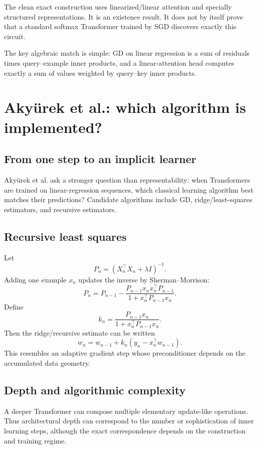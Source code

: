 \documentclass[11pt,a4paper,oneside,openany]{memoir}
\theoremstyle{definition}
\begin{document}
\begin{warningbox}
The clean exact construction uses linearized/linear attention and specially structured representations.  It is an existence result.  It does not by itself prove that a standard softmax Transformer trained by SGD discovers exactly this circuit.
\end{warningbox}

\begin{presentbox}
The key algebraic match is simple: GD on linear regression is a sum of residuals times query--example inner products, and a linear-attention head computes exactly a sum of values weighted by query--key inner products.
\end{presentbox}

\chapter{Aky\"urek et al.: which algorithm is implemented?}
\section{From one step to an implicit learner}
Aky\"urek et al. ask a stronger question than representability: when Transformers are trained on linear-regression sequences, which classical learning algorithm best matches their predictions?  Candidate algorithms include GD, ridge/least-squares estimators, and recursive estimators.

\section{Recursive least squares}
Let
\[
P_n=(X_n^\top X_n+\lambda I)^{-1}.
\]
Adding one example $x_n$ updates the inverse by Sherman--Morrison:
\[
P_n
=P_{n-1}
-\frac{P_{n-1}x_nx_n^\top P_{n-1}}
{1+x_n^\top P_{n-1}x_n}.
\]
Define
\[
k_n=\frac{P_{n-1}x_n}{1+x_n^\top P_{n-1}x_n}.
\]
Then the ridge/recursive estimate can be written
\[
\boxed{w_n=w_{n-1}+k_n(y_n-x_n^\top w_{n-1}).}
\]
This resembles an adaptive gradient step whose preconditioner depends on the accumulated data geometry.

\section{Depth and algorithmic complexity}
A deeper Transformer can compose multiple elementary update-like operations.  Thus architectural depth can correspond to the number or sophistication of inner learning steps, although the exact correspondence depends on the construction and training regime.
\end{document}
